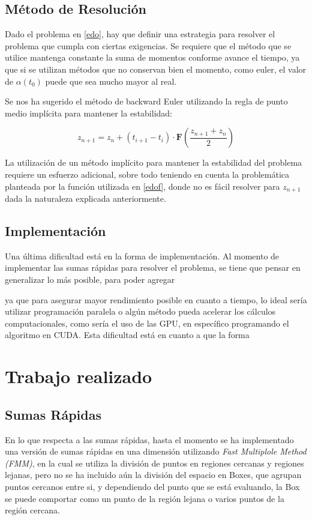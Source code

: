 \documentclass[letter, 10pt]{article}
\begin{document}
\subsection{Método de Resolución}

Dado el problema en \ref{edo}, hay que definir una estrategia para resolver el problema que cumpla con ciertas exigencias. Se requiere que el método que se utilice mantenga constante la suma de momentos conforme avance el tiempo, ya que si se utilizan métodos que no conservan bien el momento, como euler, el valor de $\alpha(t_0)$ puede que sea mucho mayor al real.

Se nos ha sugerido el método de backward Euler utilizando la regla de punto medio implícita para mantener la estabilidad:

\begin{equation}
z_{n+1} = z_n + (t_{i+1} - t_i) \cdot \mathbf{F}\left(\frac{z_{n+1} + z_n}{2}\right)
\end{equation}

La utilización de un método implícito para mantener la estabilidad del problema requiere un esfuerzo adicional, sobre todo teniendo en cuenta la problemática planteada por la función utilizada en \ref{edof}, donde no es fácil resolver para $z_{n+1}$ dada la naturaleza explicada anteriormente.


\subsection{Implementación}
Una última dificultad está en la forma de implementación. Al momento de implementar las sumas rápidas para resolver el problema, se tiene que pensar en generalizar lo más posible, para poder agregar 

ya que para asegurar mayor rendimiento posible en cuanto a tiempo, lo ideal sería utilizar programación paralela o algún método pueda acelerar los cálculos computacionales, como sería el uso de las GPU, en específico programando el algoritmo en CUDA. Esta dificultad está en cuanto a que la forma


\section{Trabajo realizado}
\subsection{Sumas Rápidas}
En lo que respecta a las sumas rápidas, hasta el momento se ha implementado una versión de sumas rápidas en una dimensión utilizando \textit{Fast Multiplole Method (FMM)}, en la cual se utiliza la división de puntos en regiones cercanas y regiones lejanas, pero no se ha incluido aún la división del espacio en Boxes, que agrupan puntos cercanos entre si, y dependiendo del punto que se está evaluando, la Box se puede comportar como un punto de la región lejana o varios puntos de la región cercana.
\end{document}
